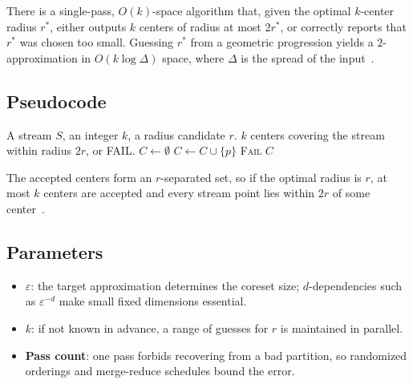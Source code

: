 \begin{theorem}\label{thm:frontiers_streaming_kcenter}
There is a single-pass, $O(k)$-space algorithm that, given the optimal
$k$-center radius $r^*$, either outputs $k$ centers of radius at most
$2 r^*$, or correctly reports that $r^*$ was chosen too small. Guessing $r^*$
from a geometric progression yields a $2$-approximation in $O(k \log
\Delta)$ space, where $\Delta$ is the spread of the
input~\cite{gonzalez1985,muthukrishnan2005}.
\end{theorem}

\subsection{Pseudocode}

\begin{algorithm}[htbp]
\caption{Streaming $k$-center (greedy, radius $r$)}
\label{alg:frontiers_streaming_kcenter}
\begin{algorithmic}[1]
\Require A stream $S$, an integer $k$, a radius candidate $r$.
\Ensure $k$ centers covering the stream within radius $2r$, or FAIL.
  \State $C \gets \emptyset$
      \State $C \gets C \cup \{p\}$
        \State \Return \textsc{Fail}
      \EndIf
    \EndIf
  \EndFor
  \State \Return $C$
\EndFunction
\end{algorithmic}
\end{algorithm}

The accepted centers form an $r$-separated set, so if the optimal radius is
$r$, at most $k$ centers are accepted and every stream point lies within $2r$
of some center~\cite{gonzalez1985}.

\subsection{Parameters}

\begin{itemize}
\item \textbf{$\varepsilon$}: the target approximation determines the coreset
  size; $d$-dependencies such as $\varepsilon^{-d}$ make small fixed
  dimensions essential.
\item \textbf{$k$}: if not known in advance, a range of guesses for $r$ is
  maintained in parallel.
\item \textbf{Pass count}: one pass forbids recovering from a bad partition,
  so randomized orderings and merge-reduce schedules bound the error.
\end{itemize}


